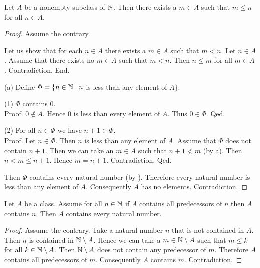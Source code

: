 \documentclass[10pt]{article}
\begin{document}
  \begin{forthel}
    \begin{proposition}
      Let $A$ be a nonempty subclass of $\mathbb{N}$.
      Then there exists a $m \in A$ such that $m \leq n$ for all $n \in A$.
    \end{proposition}
    \begin{proof}
      Assume the contrary.

      Let us show that for each $n \in A$ there exists a $m \in A$ such that $m < n$.
        Let $n \in A$.
        Assume that there exists no $m \in A$ such that $m < n$.
        Then $n \leq m$ for all $m \in A$.
        Contradiction.
      End.

      (a) Define $\Phi = \{ n \in \mathbb{N} \mid n$ is less than any element of $A \}$.

      (1) $\Phi$ contains $0$. \\
      Proof.
        $0 \notin A$.
        Hence $0$ is less than every element of $A$.
        Thus $0 \in \Phi$.
      Qed.

      (2) For all $n \in \Phi$ we have $n + 1 \in \Phi$. \\
      Proof.
        Let $n \in \Phi$.
        Then $n$ is less than any element of $A$.
        Assume that $\Phi$ does not contain $n + 1$.
        Then we can take an $m \in A$ such that $n + 1 \nless m$ (by a).
        Then $n < m \leq n + 1$.
        Hence $m = n + 1$.
        Contradiction.
      Qed.

      Then $\Phi$ contains every natural number (by ).
      Therefore every natural number is less than any element of $A$.
      Consequently $A$ has no elements.
      Contradiction.
    \end{proof}
  \end{forthel}

  \begin{forthel}
    \begin{theorem}
      Let $A$ be a class.
      Assume for all $n \in \mathbb{N}$ if $A$ contains all predecessors of $n$ then $A$ contains $n$.
      Then $A$ contains every natural number.
    \end{theorem}
    \begin{proof}
      Assume the contrary.
      Take a natural number $n$ that is not contained in $A$.
      Then $n$ is contained in $\mathbb{N} \setminus A$.
      Hence we can take a $m \in \mathbb{N} \setminus A$ such that $m \leq k$ for all $k \in \mathbb{N} \setminus A$.
      Then $\mathbb{N} \setminus A$ does not contain any predecessor of $m$.
      Therefore $A$ contains all predecessors of $m$.
      Consequently $A$ contains $m$.
      Contradiction.
    \end{proof}
  \end{forthel}
\end{document}
